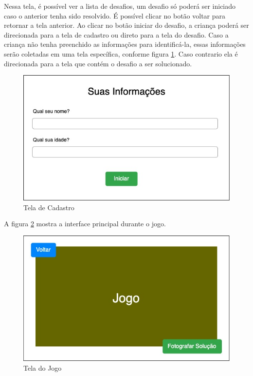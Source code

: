     Nessa tela, é possível ver a lista de desafios, um desafio só poderá ser iniciado caso o anterior tenha sido resolvido.
    É possível clicar no botão voltar para retornar a tela anterior.
    Ao clicar no botão iniciar do desafio, a criança poderá ser direcionada para a tela de cadastro ou direto para a tela do desafio.
    Caso a criança não tenha preenchido as informações para identificá-la, essas informações serão coletadas em uma tela específica, conforme figura \ref{figura:cadastro}. Caso contrario ela é direcionada para a tela que contém o desafio a ser solucionado.
    
    \begin{figure}[H]
        \caption{Tela de Cadastro}
        \begin{center}
            \includegraphics[width=\linewidth]{Imagens/cap3/informacoes_usuario.jpg}
        \end{center}
        \label{figura:cadastro}
    \end{figure}
    
    A figura \ref{figura:tela_jogo} mostra a interface principal durante o jogo.
    
    \begin{figure}[H]
        \caption{Tela do Jogo}
        \begin{center}
            \includegraphics[width=\linewidth]{Imagens/cap3/tela_jogo.jpg}
        \end{center}
        \label{figura:tela_jogo}
    \end{figure}
    
